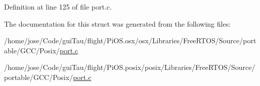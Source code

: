 Definition at line 125 of file port.\-c.



The documentation for this struct was generated from the following files\-:\begin{DoxyCompactItemize}
\item 
/home/jose/\-Code/gui\-Tau/flight/\-Pi\-O\-S.\-osx/osx/\-Libraries/\-Free\-R\-T\-O\-S/\-Source/portable/\-G\-C\-C/\-Posix/\hyperlink{osx_2osx_2_libraries_2_free_r_t_o_s_2_source_2portable_2_g_c_c_2_posix_2port_8c}{port.\-c}\item 
/home/jose/\-Code/gui\-Tau/flight/\-Pi\-O\-S.\-posix/posix/\-Libraries/\-Free\-R\-T\-O\-S/\-Source/portable/\-G\-C\-C/\-Posix/\hyperlink{posix_2posix_2_libraries_2_free_r_t_o_s_2_source_2portable_2_g_c_c_2_posix_2port_8c}{port.\-c}\end{DoxyCompactItemize}
